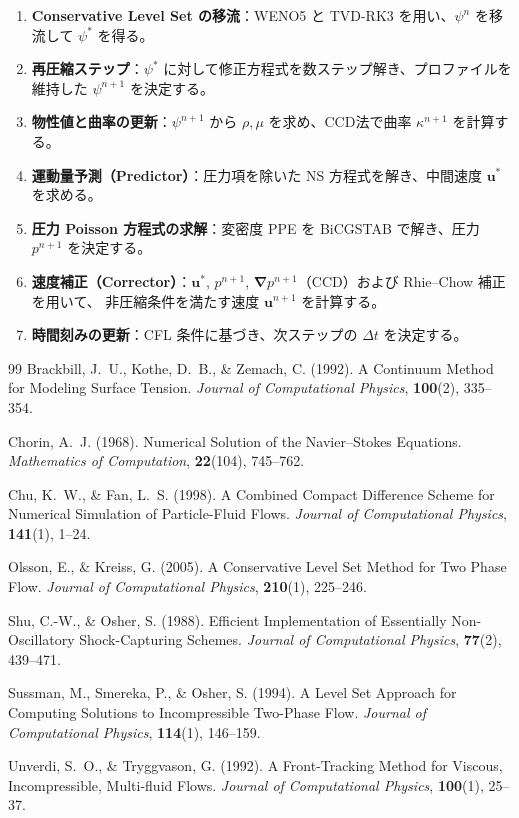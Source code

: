 \documentclass[12pt, a4paper, titlepage, xelatex, ja=standard]{bxjsarticle}
\newcommand{\bu}{\bm{u}}
\newcommand{\bnabla}{\bm{\nabla}}
\begin{document}
\begin{tcolorbox}[algbox, title={計算アルゴリズムフロー}]
\begin{enumerate}
  \item \textbf{Conservative Level Set の移流}：WENO5 と TVD-RK3 を用い、$\psi^n$ を移流して $\psi^*$ を得る。
  \item \textbf{再圧縮ステップ}：$\psi^*$ に対して修正方程式を数ステップ解き、プロファイルを維持した $\psi^{n+1}$ を決定する。
  \item \textbf{物性値と曲率の更新}：$\psi^{n+1}$ から $\rho, \mu$ を求め、CCD法で曲率 $\kappa^{n+1}$ を計算する。
  \item \textbf{運動量予測（Predictor）}：圧力項を除いた NS 方程式を解き、中間速度 $\bu^*$ を求める。
  \item \textbf{圧力 Poisson 方程式の求解}：変密度 PPE を BiCGSTAB で解き、圧力 $p^{n+1}$ を決定する。
  \item \textbf{速度補正（Corrector）}：$\bu^*$, $p^{n+1}$, $\bnabla p^{n+1}$（CCD）および Rhie--Chow 補正を用いて、
        非圧縮条件を満たす速度 $\bu^{n+1}$ を計算する。
  \item \textbf{時間刻みの更新}：CFL 条件に基づき、次ステップの $\Delta t$ を決定する。
\end{enumerate}
\end{tcolorbox}


\begin{thebibliography}{99}
Brackbill, J.~U., Kothe, D.~B., \& Zemach, C. (1992).
A Continuum Method for Modeling Surface Tension.
\textit{Journal of Computational Physics}, \textbf{100}(2), 335--354.

Chorin, A.~J. (1968).
Numerical Solution of the Navier--Stokes Equations.
\textit{Mathematics of Computation}, \textbf{22}(104), 745--762.

Chu, K.~W., \& Fan, L.~S. (1998).
A Combined Compact Difference Scheme for Numerical Simulation of Particle-Fluid Flows.
\textit{Journal of Computational Physics}, \textbf{141}(1), 1--24.

Olsson, E., \& Kreiss, G. (2005).
A Conservative Level Set Method for Two Phase Flow.
\textit{Journal of Computational Physics}, \textbf{210}(1), 225--246.

Shu, C.-W., \& Osher, S. (1988).
Efficient Implementation of Essentially Non-Oscillatory Shock-Capturing Schemes.
\textit{Journal of Computational Physics}, \textbf{77}(2), 439--471.

Sussman, M., Smereka, P., \& Osher, S. (1994).
A Level Set Approach for Computing Solutions to Incompressible Two-Phase Flow.
\textit{Journal of Computational Physics}, \textbf{114}(1), 146--159.

Unverdi, S.~O., \& Tryggvason, G. (1992).
A Front-Tracking Method for Viscous, Incompressible, Multi-fluid Flows.
\textit{Journal of Computational Physics}, \textbf{100}(1), 25--37.
\end{thebibliography}
\end{document}
